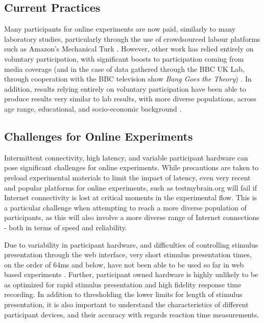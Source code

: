 \documentclass[12pt,a4paper,titlepage]{scrreprt}
\begin{document}
\subsection{Current Practices}
Many participants for online experiments are now paid, similarly to many laboratory studies, particularly through the use of crowdsourced labour platforms such as Amazon's Mechanical Turk \parencite{buhrmester_amazons_2011,rand_promise_2012,crump_evaluating_2013}. However, other work has relied entirely on voluntary participation, with significant boosts to participation coming from media coverage (and in the case of data gathered through the BBC UK Lab, through cooperation with the BBC television show \textit{Bang Goes the Theory}) \parencite{owen_putting_2010}. In addition, results relying entirely on voluntary participation have been able to produce results very similar to lab results, with more diverse populations, across age range, educational, and socio-economic background \parencite{germine_is_2012,halberda_number_2012}.

\subsection{Challenges for Online Experiments}
Intermittent connectivity, high latency, and variable participant hardware can pose significant challenges for online experiments. While precautions are taken to preload experimental materials to limit the impact of latency, even very recent and popular platforms for online experiments, such as testmybrain.org \parencite{germine_is_2012, halberda_number_2012} will fail if Internet connectivity is lost at critical moments in the experimental flow. This is a particular challenge when attempting to reach a more diverse population of participants, as this will also involve a more diverse range of Internet connections - both in terms of speed and reliability.

Due to variability in participant hardware, and difficulties of controlling stimulus presentation through the web interface, very short stimulus presentation times, on the order of 64ms and below, have not been able to be used so far in web based experiments \parencite{crump_evaluating_2013}. Further, participant owned hardware is highly unlikely to be as optimized for rapid stimulus presentation and high fidelity response time recording. In addition to thresholding the lower limits for length of stimulus presentation, it is also important to understand the characteristics of different participant devices, and their accuracy with regards reaction time measurements.
\end{document}
